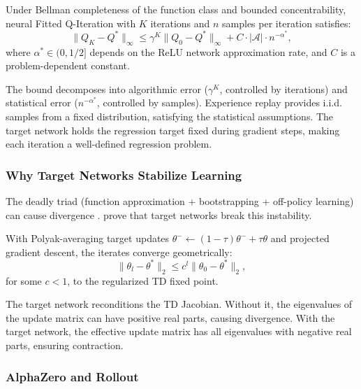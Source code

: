 \begin{theorem}
\label{thm:dqn_convergence}
Under Bellman completeness of the function class and bounded concentrability, neural Fitted Q-Iteration with $K$ iterations and $n$ samples per iteration satisfies:
\begin{equation}
\|Q_K - Q^*\|_\infty \leq \gamma^K \|Q_0 - Q^*\|_\infty + C \cdot |\mathcal{A}| \cdot n^{-\alpha^*},
\end{equation}
where $\alpha^* \in (0, 1/2]$ depends on the ReLU network approximation rate, and $C$ is a problem-dependent constant.
\end{theorem}

The bound decomposes into algorithmic error ($\gamma^K$, controlled by iterations) and statistical error ($n^{-\alpha^*}$, controlled by samples). Experience replay provides i.i.d. samples from a fixed distribution, satisfying the statistical assumptions. The target network holds the regression target fixed during gradient steps, making each iteration a well-defined regression problem.


\subsubsection{Why Target Networks Stabilize Learning}

The deadly triad (function approximation + bootstrapping + off-policy learning) can cause divergence \citep{Baird1995}. \citet{zhang2021target} prove that target networks break this instability.

\begin{theorem}
\label{thm:target_network}
With Polyak-averaging target updates $\theta^- \leftarrow (1-\tau)\theta^- + \tau\theta$ and projected gradient descent, the iterates converge geometrically:
\begin{equation}
\|\theta_l - \theta^*\|_2 \leq c^l \|\theta_0 - \theta^*\|_2,
\end{equation}
for some $c < 1$, to the regularized TD fixed point.
\end{theorem}

The target network reconditions the TD Jacobian. Without it, the eigenvalues of the update matrix can have positive real parts, causing divergence. With the target network, the effective update matrix has all eigenvalues with negative real parts, ensuring contraction.


\subsubsection{AlphaZero and Rollout}

